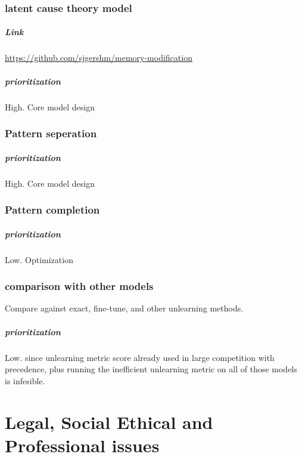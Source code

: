 \documentclass{surreydissertation}
\begin{document}
\subsection{latent cause theory model}
    \paragraph{Link} \url{https://github.com/sjgershm/memory-modification} \cite{gershman2017computational}
    \paragraph{prioritization}
    High. Core model design
\subsection{Pattern seperation}
    \paragraph{prioritization}
    High. Core model design
\subsection{Pattern completion}
    \paragraph{prioritization}
    Low. Optimization
\subsection{comparison with other models}
Compare against exact, fine-tune, and other unlearning methods.
    \paragraph{prioritization}
    Low. since unlearning metric score already used in large competition with precedence, plus running the inefficient unlearning metric on all of those models is infesible.


\chapter{Legal, Social Ethical and Professional issues}
\end{document}
